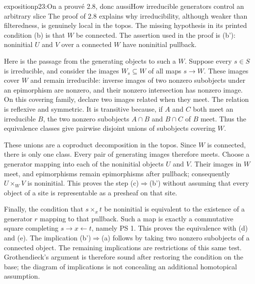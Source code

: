 \begin{dcomment}{exposition}{p23:On a prouvé 2.8, donc aussi}{How irreducible generators control an arbitrary slice}
The proof of 2.8 explains why irreducibility, although weaker than filteredness, is genuinely local in the topos. The missing hypothesis in its printed condition (b) is that $W$ be connected. The assertion used in the proof is (b'): noninitial $U$ and $V$ over a connected $W$ have noninitial pullback.

Here is the passage from the generating objects to such a $W$. Suppose every $s\in S$ is irreducible, and consider the images $W_s\subseteq W$ of all maps $s\to W$. These images cover $W$ and remain irreducible: inverse images of two nonzero subobjects under an epimorphism are nonzero, and their nonzero intersection has nonzero image. On this covering family, declare two images related when they meet. The relation is reflexive and symmetric. It is transitive because, if $A$ and $C$ both meet an irreducible $B$, the two nonzero subobjects $A\cap B$ and $B\cap C$ of $B$ meet. Thus the equivalence classes give pairwise disjoint unions of subobjects covering $W$.

These unions are a coproduct decomposition in the topos. Since $W$ is connected, there is only one class. Every pair of generating images therefore meets. Choose a generator mapping into each of the noninitial objects $U$ and $V$. Their images in $W$ meet, and epimorphisms remain epimorphisms after pullback; consequently $U\times_WV$ is noninitial. This proves the step (c)$\Rightarrow$(b') without assuming that every object of a site is representable as a presheaf on that site.

Finally, the condition that $s\times_x t$ be noninitial is equivalent to the existence of a generator $r$ mapping to that pullback. Such a map is exactly a commutative square completing $s\to x\leftarrow t$, namely PS 1. This proves the equivalence with (d) and (e). The implication (b')$\Rightarrow$(a) follows by taking two nonzero subobjects of a connected object. The remaining implications are restrictions of this same test. Grothendieck's argument is therefore sound after restoring the condition on the base; the diagram of implications is not concealing an additional homotopical assumption.
\end{dcomment}

